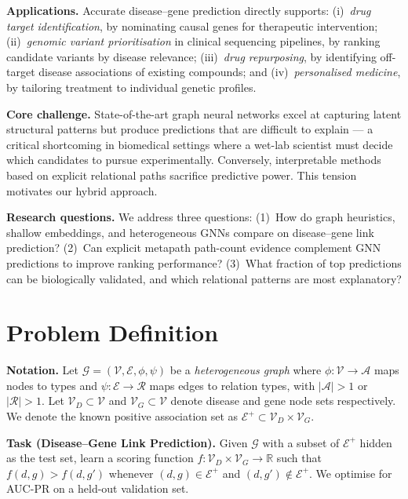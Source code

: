 \documentclass[10pt,a4paper,twocolumn]{article}
\newcommand{\Gcal}{\mathcal{G}}
\newcommand{\Vcal}{\mathcal{V}}
\newcommand{\Ecal}{\mathcal{E}}
\newcommand{\Rcal}{\mathcal{R}}
\begin{document}
\textbf{Applications.} Accurate disease--gene prediction directly supports:
(i)~\textit{drug target identification}, by nominating causal genes for
therapeutic intervention; (ii)~\textit{genomic variant prioritisation} in
clinical sequencing pipelines, by ranking candidate variants by disease
relevance; (iii)~\textit{drug repurposing}, by identifying off-target disease
associations of existing compounds; and (iv)~\textit{personalised medicine}, by
tailoring treatment to individual genetic profiles.

\textbf{Core challenge.} State-of-the-art graph neural networks excel at
capturing latent structural patterns but produce predictions that are difficult
to explain --- a critical shortcoming in biomedical settings where a wet-lab
scientist must decide which candidates to pursue experimentally. Conversely,
interpretable methods based on explicit relational paths sacrifice predictive
power. This tension motivates our hybrid approach.

\textbf{Research questions.} We address three questions: (1)~How do graph
heuristics, shallow embeddings, and heterogeneous GNNs compare on disease--gene
link prediction? (2)~Can explicit metapath path-count evidence complement GNN
predictions to improve ranking performance? (3)~What fraction of top predictions
can be biologically validated, and which relational patterns are most
explanatory?

\section{Problem Definition}
\label{sec:problem}

\textbf{Notation.} Let $\Gcal = (\Vcal, \Ecal, \phi, \psi)$ be a
\textit{heterogeneous graph} where $\phi : \Vcal \to \mathcal{A}$ maps nodes to
types and $\psi : \Ecal \to \Rcal$ maps edges to relation types, with
$|\mathcal{A}| > 1$ or $|\Rcal| > 1$. Let $\Vcal_D \subset \Vcal$ and
$\Vcal_G \subset \Vcal$ denote disease and gene node sets respectively. We
denote the known positive association set as $\Ecal^+ \subset \Vcal_D \times
\Vcal_G$.

\begin{defbox}
\textbf{Task (Disease--Gene Link Prediction).}
Given $\Gcal$ with a subset of $\Ecal^+$ hidden as the test set, learn a scoring
function $f : \Vcal_D \times \Vcal_G \to \mathbb{R}$ such that $f(d,g) > f(d,g')$
whenever $(d,g) \in \Ecal^+$ and $(d,g') \notin \Ecal^+$. We optimise for
AUC-PR on a held-out validation set.
\end{defbox}
\end{document}
